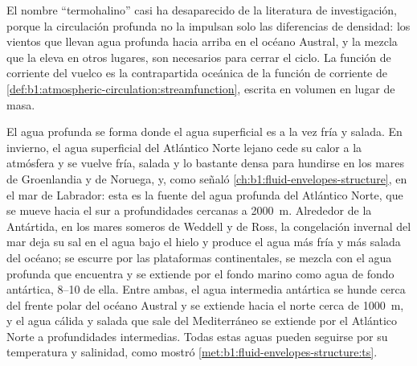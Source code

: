 El nombre ``termohalino'' casi ha desaparecido de la literatura de investigación, porque la circulación profunda no la impulsan solo las diferencias de densidad: los vientos que llevan agua profunda hacia arriba en el océano Austral, y la mezcla que la eleva en otros lugares, son necesarios para cerrar el ciclo. La función de corriente del vuelco es la contrapartida oceánica de la función de corriente de \cref{def:b1:atmospheric-circulation:streamfunction}, escrita en volumen en lugar de masa.

El agua profunda se forma donde el agua superficial es a la vez fría y salada. En invierno, el agua superficial del Atlántico Norte lejano cede su calor a la atmósfera y se vuelve fría, salada y lo bastante densa para hundirse en los mares de Groenlandia y de Noruega, y, como señaló \cref{ch:b1:fluid-envelopes-structure}, en el mar de Labrador: esta es la fuente del agua profunda del Atlántico Norte, que se mueve hacia el sur a profundidades cercanas a \qty{2000}{m}. Alrededor de la Antártida, en los mares someros de Weddell y de Ross, la congelación invernal del mar deja su sal en el agua bajo el hielo y produce el agua más fría y más salada del océano; se escurre por las plataformas continentales, se mezcla con el agua profunda que encuentra y se extiende por el fondo marino como agua de fondo antártica, \qtyrange{8}{10}{\sverdrup} de ella. Entre ambas, el agua intermedia antártica se hunde cerca del frente polar del océano Austral y se extiende hacia el norte cerca de \qty{1000}{m}, y el agua cálida y salada que sale del Mediterráneo se extiende por el Atlántico Norte a profundidades intermedias. Todas estas aguas pueden seguirse por su temperatura y salinidad, como mostró \cref{met:b1:fluid-envelopes-structure:ts}.

